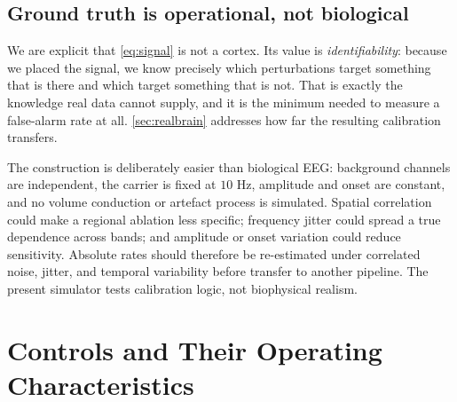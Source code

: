 \documentclass[manuscript,nonacm]{acmart}
\begin{document}
\subsection{Ground truth is operational, not biological}
We are explicit that \cref{eq:signal} is not a cortex. Its value is
\emph{identifiability}: because we placed the signal, we know precisely which
perturbations target something that is there and which target something that is not.
That is exactly the knowledge real data cannot supply, and it is the minimum needed to
measure a false-alarm rate at all. \cref{sec:realbrain} addresses how far the resulting
calibration transfers.

The construction is deliberately easier than biological EEG: background channels are
independent, the carrier is fixed at $10$ Hz, amplitude and onset are constant, and no
volume conduction or artefact process is simulated. Spatial correlation could make a
regional ablation less specific; frequency jitter could spread a true dependence across
bands; and amplitude or onset variation could reduce sensitivity. Absolute rates should
therefore be re-estimated under correlated noise, jitter, and temporal variability
before transfer to another pipeline. The present simulator tests calibration logic, not
biophysical realism.

\section{Controls and Their Operating Characteristics}
\end{document}
